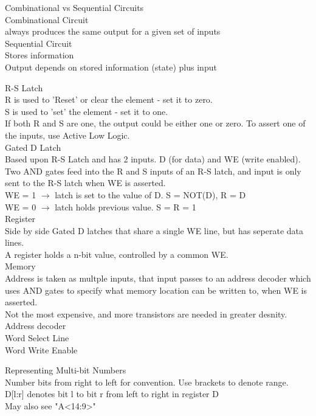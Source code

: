 \documentclass{article}
\begin{document}
\noindent
\Large
Combinational vs Sequential Circuits\\
\normalsize
\noindent
Combinational Circuit\\
always produces the same output for a given set of inputs\\
Sequential Circuit\\
Stores information\\
Output depends on stored information (state) plus input

\noindent
\Large
R-S Latch\\
\normalsize
\noindent
R is used to 'Reset' or clear the element - set it to zero.\\
S is used to 'set' the element - set it to one.\\
If both R and S are one, the output could be either one or zero. To assert one of the inputs, use Active Low Logic.\\

\noindent
\Large
Gated D Latch\\
\normalsize
\noindent
Based upon R-S Latch and has 2 inputs. D (for data) and WE (write enabled). Two AND gates feed into the R and S inputs of an R-S latch, and input is only sent to the R-S latch when WE is asserted.\\
WE = 1 $\to$ latch is set to the value of D. S = NOT(D), R = D\\
WE = 0 $\to$ latch holds previous value. S = R = 1\\

\noindent
\Large
Register\\
\normalsize
\noindent
Side by side Gated D latches that share a single WE line, but has seperate data lines.\\
A register holds a n-bit value, controlled by a common WE.\\

\noindent
\Large
Memory\\
\normalsize
\noindent
Address is taken as multple inputs, that input passes to an address decoder which uses AND gates to specify what memory location can be written to, when WE is asserted.\\
Not the most expensive, and more transistors are needed in greater desnity.\\
Address decoder\\
Word Select Line\\
Word Write Enable

\noindent
\Large
Representing Multi-bit Numbers\\
\normalsize
\noindent
Number bits from right to left for convention. Use brackets to denote range.\\
D[l:r] denotes bit l to bit r from left to right in register D\\
May also see "A<14:9>"\\
\end{document}
